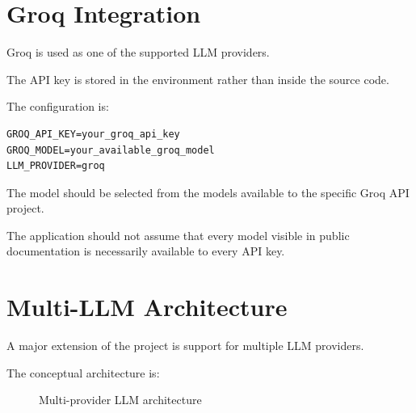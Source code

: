 \documentclass[11pt,a4paper]{article}
\begin{document}
\section{Groq Integration}

Groq is used as one of the supported LLM providers.

The API key is stored in the environment rather than inside the source
code.

The configuration is:

\begin{lstlisting}[style=env]
GROQ_API_KEY=your_groq_api_key
GROQ_MODEL=your_available_groq_model
LLM_PROVIDER=groq
\end{lstlisting}

The model should be selected from the models available to the
specific Groq API project.

The application should not assume that every model visible in public
documentation is necessarily available to every API key.

\section{Multi-LLM Architecture}

A major extension of the project is support for multiple LLM providers.

The conceptual architecture is:

\begin{figure}[H]
\centering


\caption{Multi-provider LLM architecture}
\end{figure}
\end{document}
